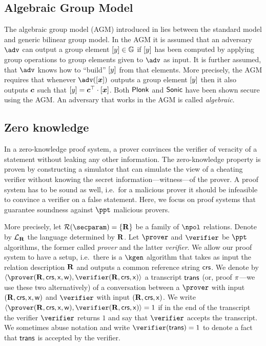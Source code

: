 \let\accentvec\vec \documentclass[runningheads]{llncs}
\def\vec#1{\mathchoice{\mbox{\boldmath$\displaystyle#1$}}
{\mbox{\boldmath$\textstyle#1$}} {\mbox{\boldmath$\scriptstyle#1$}}
{\mbox{\boldmath$\scriptscriptstyle#1$}}}
\begin{document}
\subsection{Algebraic Group Model}
The algebraic group model (AGM) introduced in \cite{C:FucKilLos18} lies
between the standard model and generic bilinear group model. In the AGM it is
assumed that an adversary $\adv$ can output a group element $\left[y\right] \in
\mathbb{G}$ if $\left[y\right]$ has been computed by applying group operations to group
elements given to $\adv$ as input. It is further assumed, that $\adv$ knows
how to ``build'' $\left[y\right]$ from that elements. More precisely, the AGM
requires that whenever $\adv(\gnone{\vec{x}})$ outputs a group element
$\left[y\right]$ then it also outputs $\vec{c}$ such that $\gnone{y} = \vec{c}^\top
\cdot \gnone{\vec{x}}$. Both $\textnormal{\textsf{Plonk}}$ and ${\textnormal{\textsf{Sonic}}}$
have been shown secure using the AGM. An adversary that works in the AGM is
called \emph{algebraic}. 

\subsection{Zero knowledge}
In a zero-knowledge proof system, a prover convinces the verifier of
 veracity of a statement without leaking any other information. 
The zero-knowledge property is proven by constructing a simulator that can
simulate the view of a cheating verifier without knowing the secret
information---witness---of the prover.
 A proof system
 has to be sound as well, i.e.~for a malicious prover it should be infeasible
 to convince a verifier on a false statement.
Here, we focus on proof systems that guarantee soundness against $\ppt$
malicious provers.

More precisely, let $\RELGEN(\secparam) = \smallset{\REL}$ be a family of
$\npol$ relations.
Denote by $\mathcal{L}_{\mathbf{R}}$ the language determined by $\mathbf{R}$.
Let $\prover$ and $\verifier$ be $\ppt$ algorithms, the former called \emph{prover}
and the latter \emph{verifier}. We allow our proof system to have a setup,
i.e.~there is a $\kgen$ algorithm that takes as input the relation
description $\mathbf{R}$ and
outputs a common reference string $\mathsf{crs}$.
We denote by $\ip{\prover(\REL, \crs, \inp, \wit)}{\verifier(\REL,
\crs,\inp)}$ a transcript $\mathsf{trans}$ (or, proof $\pi$---we use these two
alternatively) of a conversation between a $\prover$ with input
$(\mathbf{R}, \mathsf{crs}, \mathsf{x}, \mathsf{w})$ and $\verifier$ with input $(\mathbf{R}, \mathsf{crs}, \mathsf{x})$.
We write $\ip{\prover (\REL, \crs, \inp, \wit)}{\verifier(\REL, \crs, \inp)} =
1$ if in the end of the transcript the verifier $\verifier$ returns $1$ and
say that $\verifier$ accepts the transcript. We sometimes abuse notation and
write $\verifier(\trans) = 1$ to denote a fact that $\mathsf{trans}$ is accepted by
the verifier. 
\end{document}

